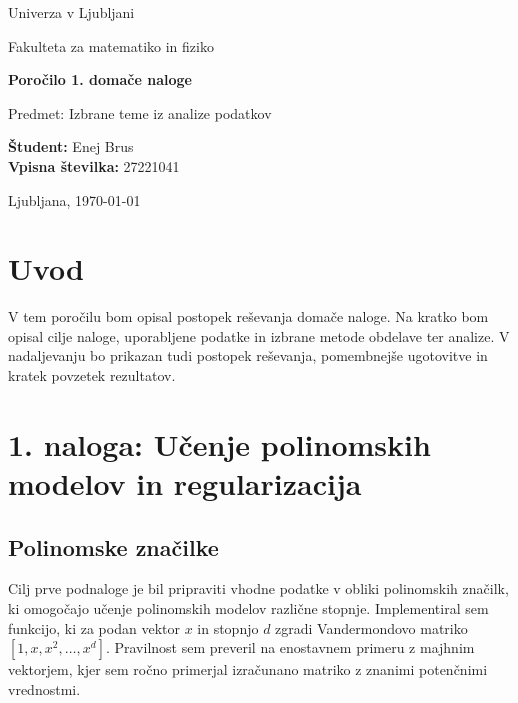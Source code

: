 \documentclass[12pt,a4paper]{article}
\begin{document}
\begin{titlepage}
    \centering

    {\Large Univerza v Ljubljani\par}
    \vspace{0.5cm}
    {\large Fakulteta za matematiko in fiziko\par}

    \vfill

    {\Huge \bfseries Poročilo 1. domače naloge\par}
    \vspace{1cm}
    {\Large Predmet: Izbrane teme iz analize podatkov\par}

    \vfill

    \begin{flushleft}
        \large
        \textbf{Študent:} Enej Brus\\
        \textbf{Vpisna številka:} 27221041  \\
     \end{flushleft}

    \vfill

    {\large Ljubljana, \today\par}
\end{titlepage}


\tableofcontents
\newpage

\section{Uvod}
V tem poročilu bom opisal postopek reševanja 
domače naloge. Na kratko bom opisal cilje naloge, 
uporabljene podatke in izbrane metode obdelave ter analize. 
V nadaljevanju bo prikazan tudi postopek reševanja,
pomembnejše ugotovitve in kratek povzetek rezultatov.


\section{1. naloga: Učenje polinomskih modelov in regularizacija}

\subsection{Polinomske značilke}
Cilj prve podnaloge je bil pripraviti vhodne podatke v obliki polinomskih značilk, ki omogočajo učenje polinomskih modelov različne stopnje. Implementiral sem funkcijo, ki za podan vektor $x$ in stopnjo $d$ zgradi Vandermondovo matriko $[1, x, x^2, \ldots, x^d]$.
Pravilnost sem preveril na enostavnem primeru z majhnim vektorjem,
kjer sem ročno primerjal izračunano matriko z znanimi potenčnimi vrednostmi.
\end{document}
